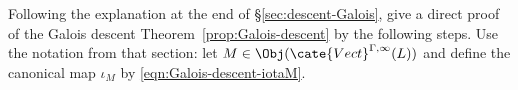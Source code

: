 
\hypertarget{o014.aljabr2.chapter7.exercises-c}{ }
	\item Following the explanation at the end of
	\S\ref{sec:descent-Galois}, give a direct proof of the Galois descent
	Theorem~\ref{prop:Galois-descent} by the following steps. Use the notation
	from that section: let $M\in\Obj(\cate{Vect}^{\Gamma,\infty}(L))$ and
	define the canonical map $\iota_M$ by \eqref{eqn:Galois-descent-iotaM}.
